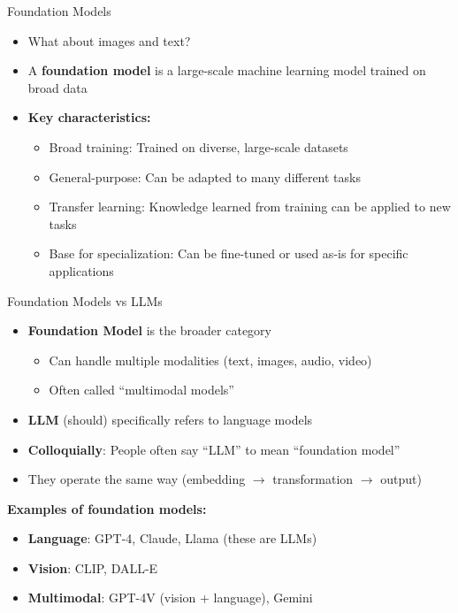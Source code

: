 \documentclass[aspectratio=169]{beamer}
\begin{document}
\begin{frame}{Foundation Models}
\begin{itemize}
	
	\item What about images and text?

    \item A \textbf{foundation model} is a large-scale machine learning model trained on broad data 
    \item \textbf{Key characteristics:}
    \begin{itemize}
        \item Broad training: Trained on diverse, large-scale datasets
        \item General-purpose: Can be adapted to many different tasks
        \item Transfer learning: Knowledge learned from training can be applied to new tasks
        \item Base for specialization: Can be fine-tuned or used as-is for specific applications
    \end{itemize}
\end{itemize}
\end{frame}

\begin{frame}{Foundation Models vs LLMs}
\begin{itemize}
    \item \textbf{Foundation Model} is the broader category
    \begin{itemize}
        \item Can handle multiple modalities (text, images, audio, video)
        \item Often called ``multimodal models''
    \end{itemize}
    \item \textbf{LLM} (should) specifically refers to language models
    \item \textbf{Colloquially}: People often say ``LLM'' to mean ``foundation model''
    \item They operate the same way (embedding $\rightarrow$ transformation $\rightarrow$ output)
\end{itemize}
\vspace{0.5cm}
\textbf{Examples of foundation models:}
\begin{itemize}
    \item \textbf{Language}: GPT-4, Claude, Llama (these are LLMs)
    \item \textbf{Vision}: CLIP, DALL-E
    \item \textbf{Multimodal}: GPT-4V (vision + language), Gemini
\end{itemize}
\end{frame}
\end{document}
